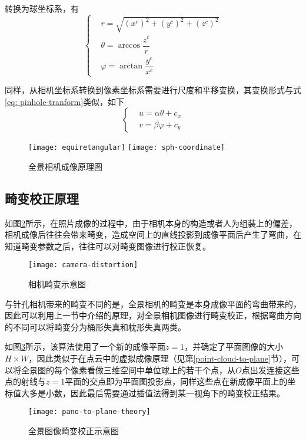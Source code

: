 转换为球坐标系，有
\begin{equation}
	\left\{
	\begin{aligned}
		&r = \sqrt{(x^c)^2+(y^c)^2+(z^c)^2}\\
		&\theta = \arccos \dfrac{z^c}{r}\\
		&\varphi = \arctan \dfrac{y^c}{x^c}
	\end{aligned}
	\right.
\end{equation}

同样，从相机坐标系转换到像素坐标系需要进行尺度和平移变换，其变换形式与式\ref{eq: pinhole-tranform}类似，如下
\begin{equation}
	\left\{
	\begin{aligned}
		& u = \alpha \theta+ c_x\\
		& v = \beta \varphi + c_y
	\end{aligned}
	\right.
\end{equation}

\begin{figure}
	\centering
		{\texttt{[image: equiretangular]}}
	{\texttt{[image: sph-coordinate]}}
	\caption{全景相机成像原理图}
	\label{omnidirectional-camera}
\end{figure}

\subsection{畸变校正原理}
如图\ref{camera-distortion}所示，在照片成像的过程中，由于相机本身的构造或者人为组装上的偏差，相机成像后往往会带来畸变，造成空间上的直线投影到成像平面后产生了弯曲，在知道畸变参数之后，往往可以对畸变图像进行校正恢复。
\begin{figure}
	\centering
	\texttt{[image: camera-distortion]}
	\caption{相机畸变示意图}
	\label{camera-distortion}
\end{figure}

与针孔相机带来的畸变不同的是，全景相机的畸变是本身成像平面的弯曲带来的，因此可以利用上一节中介绍的原理，对全景相机图像进行畸变校正，根据弯曲方向的不同可以将畸变分为桶形失真和枕形失真两类。

如图\ref{pano-to-plane-theory}所示，该算法使用了一个新的成像平面$z=1$，并确定了平面图像的大小$H\times W$，因此类似于在点云中的虚拟成像原理（见第\ref{point-cloud-to-plane}节），可以将全景图的每个像素看做三维空间中单位球上的若干个点，从$O$点出发连接这些点的射线与$z=1$平面的交点即为平面图投影点，同样这些点在新成像平面上的坐标值大多是小数，因此最后需要通过插值法得到某一视角下的畸变校正结果。
\begin{figure}
	\centering
	\texttt{[image: pano-to-plane-theory]}
	\caption{全景图像畸变校正示意图}
	\label{pano-to-plane-theory}
\end{figure}

